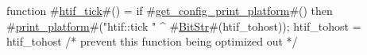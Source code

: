 function #\hyperref[sailRISCVzhtifzytick]{htif\_tick}#() = {
  if   #\hyperref[sailRISCVzgetzyconfigzyprintzyplatform]{get\_config\_print\_platform}#()
  then #\hyperref[sailRISCVzprintzyplatform]{print\_platform}#("htif::tick " ^ #\hyperref[sailRISCVzBitStr]{BitStr}#(htif_tohost));
  htif_tohost = htif_tohost /* prevent this function being optimized out */
}
